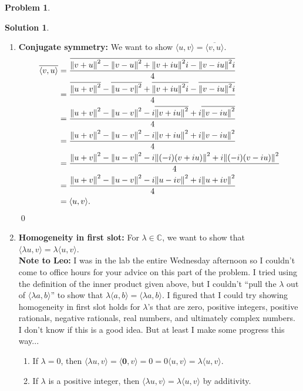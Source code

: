 \documentclass{book}
\theoremstyle{definition}
\newtheorem*{prob*}{Problem}
\newtheorem*{sln*}{Solution}
\newcommand{\la}{\langle}
\newcommand{\ra}{\rangle}
\begin{document}
\begin{prob*}
\begin{enumerate}
\begin{sln*}
\begin{enumerate}
				\item \textbf{Conjugate symmetry:} We want to show $\la u,v \ra = \overline{\la v,u \ra}$. 
				\begin{align*}
				\overline{\la v,u \ra} 
				&= \frac{\overline{\norm{v+u}^2  - \norm{v-u}^2 + \norm{v + iu}^2i - \norm{v - iu}^2i  } }{4}\\
				&= \frac{\overline{\norm{u+ v}^2}  - \overline{\norm{u-v}^2} + \overline{\norm{v + iu}^2i} - \overline{\norm{v - iu}^2i  } }{4} \\
				&= \frac{{\norm{u+ v}^2}  - {\norm{u-v}^2} - i\overline{\norm{v + iu}^2} + i\overline{\norm{v - iu}^2  } }{4}\\
				&= \frac{{\norm{u+ v}^2}  - {\norm{u-v}^2} - i{\norm{v + iu}^2} + i{\norm{v - iu}^2  } }{4}\\
				&= \frac{{\norm{u+ v}^2}  - {\norm{u-v}^2} - i{\norm{(-i)(v + iu)}^2} + i{\norm{(-i)(v - iu)}^2 } }{4}\\
				&= \frac{{\norm{u+ v}^2}  - {\norm{u-v}^2} - i{\norm{u -iv}^2} + i{\norm{u + iv}^2 } }{4}\\
				&= \la u,v \ra.
				\end{align*}\qed
				
				
				\item \textbf{Homogeneity in first slot:} For $\lambda \in \mathbb{C}$, we want to show that $\la \lambda u,v\ra = \lambda \la u , v \ra$. \\
				
				\textbf{Note to Leo:} I was in the lab the entire Wednesday afternoon so I couldn't come to office hours for your advice on this part of the problem. I tried using the definition of the inner product given above, but I couldn't ``pull the $\lambda$ out of $\la \lambda a ,b\ra$'' to show that $\lambda \la a,b \ra = \la \lambda a , b\ra$. I figured that I could try showing homogeneity in first slot holds for $\lambda$'s that are zero, positive integers, positive rationals, negative rationals, real numbers, and ultimately complex numbers. I don't know if this is a good idea. But at least I make some progress this way...
				
				\begin{enumerate}
					\item If $\lambda = 0$, then $\la \lambda u ,v \ra = \la \mathbf{0},v\ra = 0 =  0\la u,v \ra = \lambda\la u,v \ra$.
					
					\item If $\lambda$ is a positive integer, then 
					$\la \lambda u,v \ra = \lambda\la u,v \ra$
					by additivity.
					

\end{enumerate}
\end{enumerate}
\end{sln*}
\end{enumerate}
\end{prob*}
\end{document}
